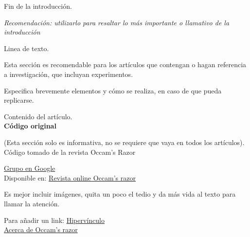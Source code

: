 \begin{multicols}{2}
\noindent

Fin de la introducción.\\


\begin{entradilla}
{\em Recomendación: {\color{introcolor}{para este tipo de texto}}
  utilizarlo para resaltar lo más importante o llamativo de la introducción}
\end{entradilla}



Linea de texto.


Esta sección es recomendable para los artículos que contengan o hagan referencia a investigación, que incluyan experimentos.


Especifica brevemente elementos y cómo se realiza, en caso de que pueda replicarse.



Contenido del artículo. \\

\textsf {\textbf {Código original }}

(Esta sección solo es informativa, no se requiere que vaya en todos los artículos).\\ Código tomado de la revista Occam's Razor

{\href{https://groups.google.com/forum/#!forum/revista-occams-razor}{Grupo en Google}} \\
Disponible en:  
{\href{http://www.papermint-designs.com/roor/}{Revista online Occam's razor}}

Es mejor incluir imágenes, quita un poco el tedio y da más vida al texto para llamar la atención.

\begin{center}
\end{center}


Para añadir un link:
\href{https://glud.org/}{Hipervínculo} \\
\href{https://blog.desdelinux.net/occamss-razor-publicacion-libre-de-divulgacion-cientifica/}{Acerca de Occam's razor} \\



\end{multicols}
